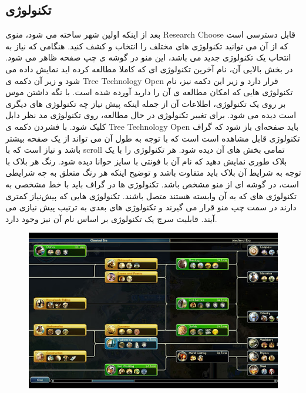 \documentclass[]{article}
\begin{document}
\subsection*{{\titr تکنولوژی}}

بعد از اینکه اولین شهر ساخته می شود، منوی  Research Choose قابل دسترسی است که از آن می توانید تکنولوژی های مختلف را انتخاب و کشف کنید.
هنگامی که نیاز به انتخاب یک تکنولوژی جدید می باشد، این منو در گوشه ی چپ صفحه ظاهر می شود. در بخش بالایی آن، نام آخرین تکنولوژی ای که کاملا مطالعه کرده اید نمایش داده می شود و زیر آن دکمه ی Tree Technology Open قرار دارد و زیر این دکمه نیز، نام تکنولوژی هایی که امکان مطالعه ی آن را دارید آورده شده است. با نگه داشتن موس بر روی یک تکنولوژی، اطلاعات آن از جمله اینکه پیش نیاز چه تکنولوژی های دیگری است دیده می شود.
برای تغییر تکنولوژی در حال مطالعه، روی تکنولوژی مد نظر دابل کلیک شود.
با فشردن دکمه ی Tree Technology Open باید صفحه‌ای باز شود که گراف تکنولوژی قابل مشاهده است است که با توجه به طول آن می تواند از یک صفحه بیشتر باشد و نیاز است که با scroll تمامی بخش های آن دیده شود. هر تکنولوژی را با یک بلاک طوری نمایش دهید که نام آن با فونتی با سایز خوانا دیده شود. رنگ هر بلاک با توجه به شرایط آن بلاک باید متفاوت باشد و توضیح اینکه هر رنگ متعلق به چه شرایطی است، در گوشه ای از منو مشخص باشد. تکنولوژی ها در گراف باید با خط مشخصی به تکنولوژی های که به آن وابسته هستند متصل باشند. تکنولوژی هایی که پیش‌نیاز کمتری دارند در سمت چپ منو قرار می گیرند و تکنولوژی های بعدی به ترتیب پیش نیازی می آیند. قابلیت سرچ یک تکنولوژی بر اساس نام آن نیز وجود دارد.


\begin{figure}[H]
    \centerline{\includegraphics[scale=0.8]{resources/technology.jpg}}
\end{figure}
\end{document}
